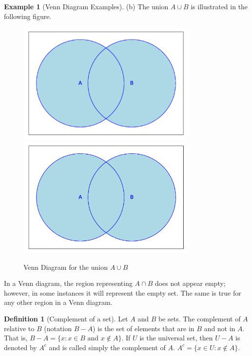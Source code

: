 \documentclass[10pt,]{book}
\theoremstyle{plain}
\theoremstyle{definition}
\newtheorem{definition}[theorem]{Definition}
\newtheorem{example}[theorem]{Example}
\begin{document}
\begin{example}[Venn Diagram Examples]
\par
(b) The union \(A \cup  B\) is illustrated in the following figure.
            \leavevmode%
\begin{figure}
\centering
{}%
{\includegraphics[width=0.80\textwidth]{images/sageplot-venn-union.pdf}}%
{\includegraphics[width=0.80\textwidth]{images/sageplot-venn-union.png}}
\caption{Venn Diagram for the union \(A \cup  B\) \label{venn_diagram_union}}
\end{figure}
 
In a Venn diagram, the region representing \(A \cap  B\) does not appear empty; however, in some instances it will represent the empty set. The same is true for any other region in a Venn diagram. 
%
\end{example}
\begin{definition}[Complement of a set]\label{set_complement.}
Let \( A\) and \( B\) be sets. The complement of \( A\) relative to \( B\) (notation
\(B - A\)) is the set of elements that are in \( B\) and not in \( A\). That is, \(B-A=\{x: x\in B \textrm{ and } x\notin A\}\). If \(
U\) is the universal set, then \(U-A\) is denoted by \(A^c\) and is called simply the complement of \( A\). \(A^c=\{x\in U : x\notin A\}\). 
\end{definition}
\end{document}

